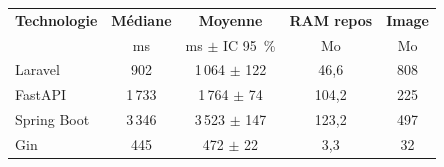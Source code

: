\begin{tabular}{@{}lcccc@{}}
\toprule
\textbf{Technologie} & \textbf{Médiane} & \textbf{Moyenne} & \textbf{RAM repos} & \textbf{Image} \\
 & ms & ms $\pm$ IC 95~\% & Mo & Mo \\
\midrule
Laravel & 902 & 1\,064 $\pm$ 122 & 46,6 & 808 \\
FastAPI & 1\,733 & 1\,764 $\pm$ 74 & 104,2 & 225 \\
Spring Boot & 3\,346 & 3\,523 $\pm$ 147 & 123,2 & 497 \\
Gin & 445 & 472 $\pm$ 22 & 3,3 & 32 \\
\bottomrule
\end{tabular}
